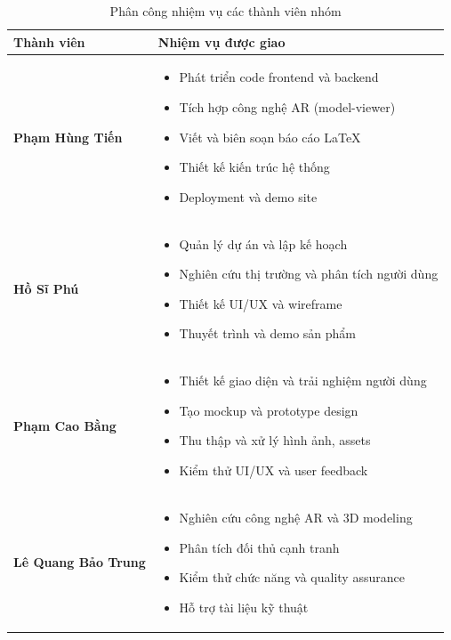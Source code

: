 \documentclass[12pt,a4paper]{article}
\begin{document}
\begin{table}[H]
\centering
\caption{Phân công nhiệm vụ các thành viên nhóm}
\label{tab:task-assignment}
\begin{tabular}{@{}>{\raggedright\arraybackslash}p{3.5cm}>{\raggedright\arraybackslash}p{11cm}@{}}
\toprule
\textbf{Thành viên} & \textbf{Nhiệm vụ được giao} \\
\midrule
\textbf{Phạm Hùng Tiến} & 
\begin{itemize}[leftmargin=0.3cm,topsep=0pt,itemsep=1pt]
    \item Phát triển code frontend và backend
    \item Tích hợp công nghệ AR (model-viewer)
    \item Viết và biên soạn báo cáo LaTeX
    \item Thiết kế kiến trúc hệ thống
    \item Deployment và demo site
\end{itemize} \\
\midrule
\textbf{Hồ Sĩ Phú} & 
\begin{itemize}[leftmargin=0.3cm,topsep=0pt,itemsep=1pt]
    \item Quản lý dự án và lập kế hoạch
    \item Nghiên cứu thị trường và phân tích người dùng
    \item Thiết kế UI/UX và wireframe
    \item Thuyết trình và demo sản phẩm
\end{itemize} \\
\midrule
\textbf{Phạm Cao Bằng} & 
\begin{itemize}[leftmargin=0.3cm,topsep=0pt,itemsep=1pt]
    \item Thiết kế giao diện và trải nghiệm người dùng
    \item Tạo mockup và prototype design
    \item Thu thập và xử lý hình ảnh, assets
    \item Kiểm thử UI/UX và user feedback
\end{itemize} \\
\midrule
\textbf{Lê Quang Bảo Trung} & 
\begin{itemize}[leftmargin=0.3cm,topsep=0pt,itemsep=1pt]
    \item Nghiên cứu công nghệ AR và 3D modeling
    \item Phân tích đối thủ cạnh tranh
    \item Kiểm thử chức năng và quality assurance
    \item Hỗ trợ tài liệu kỹ thuật

\end{itemize}
\end{tabular}
\end{table}
\end{document}
